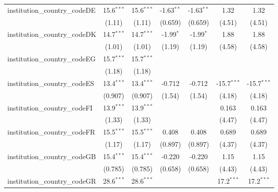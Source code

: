 \begin{tabular}{lcccccc}
   institution\_country\_codeDE          & 15.6$^{***}$  & 15.6$^{***}$  & -1.63$^{**}$  & -1.63$^{**}$  & 1.32          & 1.32\\   
                                         & (1.11)        & (1.11)        & (0.659)       & (0.659)       & (4.51)        & (4.51)\\   
   institution\_country\_codeDK          & 14.7$^{***}$  & 14.7$^{***}$  & -1.99$^{*}$   & -1.99$^{*}$   & 1.88          & 1.88\\   
                                         & (1.01)        & (1.01)        & (1.19)        & (1.19)        & (4.58)        & (4.58)\\   
   institution\_country\_codeEG          & 15.7$^{***}$  & 15.7$^{***}$  &               &               &               &   \\   
                                         & (1.18)        & (1.18)        &               &               &               &   \\   
   institution\_country\_codeES          & 13.4$^{***}$  & 13.4$^{***}$  & -0.712        & -0.712        & -15.7$^{***}$ & -15.7$^{***}$\\   
                                         & (0.907)       & (0.907)       & (1.54)        & (1.54)        & (4.18)        & (4.18)\\   
   institution\_country\_codeFI          & 13.9$^{***}$  & 13.9$^{***}$  &               &               & 0.163         & 0.163\\   
                                         & (1.33)        & (1.33)        &               &               & (4.47)        & (4.47)\\   
   institution\_country\_codeFR          & 15.5$^{***}$  & 15.5$^{***}$  & 0.408         & 0.408         & 0.689         & 0.689\\   
                                         & (1.17)        & (1.17)        & (0.897)       & (0.897)       & (4.37)        & (4.37)\\   
   institution\_country\_codeGB          & 15.4$^{***}$  & 15.4$^{***}$  & -0.220        & -0.220        & 1.15          & 1.15\\   
                                         & (0.785)       & (0.785)       & (0.658)       & (0.658)       & (4.43)        & (4.43)\\   
   institution\_country\_codeGR          & 28.6$^{***}$  & 28.6$^{***}$  &               &               & 17.2$^{***}$  & 17.2$^{***}$\\   

\end{tabular}
